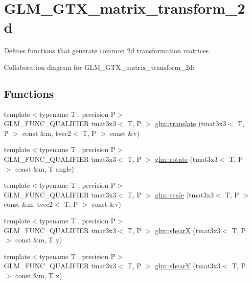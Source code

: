 \hypertarget{group__gtx__matrix__transform__2d}{\section{G\-L\-M\-\_\-\-G\-T\-X\-\_\-matrix\-\_\-transform\-\_\-2d}
\label{group__gtx__matrix__transform__2d}
}


Defines functions that generate common 2d transformation matrices.  


Collaboration diagram for G\-L\-M\-\_\-\-G\-T\-X\-\_\-matrix\-\_\-transform\-\_\-2d\-:
\subsection*{Functions}
\begin{DoxyCompactItemize}
\item 
{\footnotesize template$<$typename T , precision P$>$ }\\G\-L\-M\-\_\-\-F\-U\-N\-C\-\_\-\-Q\-U\-A\-L\-I\-F\-I\-E\-R tmat3x3$<$ T, P $>$ \hyperlink{group__gtx__matrix__transform__2d_ga3786656ac137084ef73151636eff44d8}{glm\-::translate} (tmat3x3$<$ T, P $>$ const \&m, tvec2$<$ T, P $>$ const \&v)
\item 
{\footnotesize template$<$typename T , precision P$>$ }\\G\-L\-M\-\_\-\-F\-U\-N\-C\-\_\-\-Q\-U\-A\-L\-I\-F\-I\-E\-R tmat3x3$<$ T, P $>$ \hyperlink{group__gtx__matrix__transform__2d_ga23ec870ee4b75d85cc021e0fd1532b48}{glm\-::rotate} (tmat3x3$<$ T, P $>$ const \&m, T angle)
\item 
{\footnotesize template$<$typename T , precision P$>$ }\\G\-L\-M\-\_\-\-F\-U\-N\-C\-\_\-\-Q\-U\-A\-L\-I\-F\-I\-E\-R tmat3x3$<$ T, P $>$ \hyperlink{group__gtx__matrix__transform__2d_gadb9f2a729d399ae5e9c33eb64d0d66fe}{glm\-::scale} (tmat3x3$<$ T, P $>$ const \&m, tvec2$<$ T, P $>$ const \&v)
\item 
{\footnotesize template$<$typename T , precision P$>$ }\\G\-L\-M\-\_\-\-F\-U\-N\-C\-\_\-\-Q\-U\-A\-L\-I\-F\-I\-E\-R tmat3x3$<$ T, P $>$ \hyperlink{group__gtx__matrix__transform__2d_gab3363478cb625e40c5bd924fd838cf54}{glm\-::shear\-X} (tmat3x3$<$ T, P $>$ const \&m, T y)
\item 
{\footnotesize template$<$typename T , precision P$>$ }\\G\-L\-M\-\_\-\-F\-U\-N\-C\-\_\-\-Q\-U\-A\-L\-I\-F\-I\-E\-R tmat3x3$<$ T, P $>$ \hyperlink{group__gtx__matrix__transform__2d_ga69bfb47d250df7464a5b14f2b95a9b4a}{glm\-::shear\-Y} (tmat3x3$<$ T, P $>$ const \&m, T x)
\end{DoxyCompactItemize}


